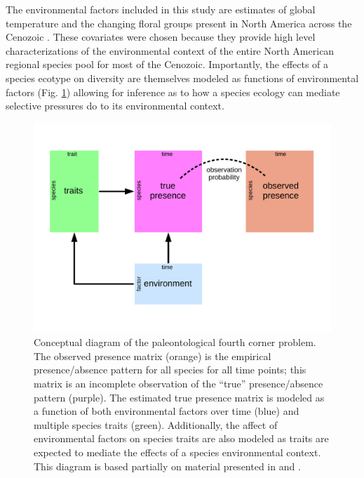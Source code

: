 \documentclass[12pt,letterpaper]{article}
\begin{document}
The environmental factors included in this study are estimates of global temperature and the changing floral groups present in North America across the Cenozoic \citep{Cramer2011,Graham2011a}. These covariates were chosen because they provide high level characterizations of the environmental context of the entire North American regional species pool for most of the Cenozoic. Importantly, the effects of a species ecotype on diversity are themselves modeled as functions of environmental factors (Fig. \ref{fig:concept_fourth_corner}) allowing for inference as to how a species ecology can mediate selective pressures do to its environmental context. 

\begin{figure}[ht]
  \centering
  \includegraphics[width=\textwidth,height=0.4\textheight,keepaspectratio=true]{figure/paleo_fourth_corner}
  \caption[Conceptual diagram of the paleontological fourth-courner problem]{Conceptual diagram of the paleontological fourth corner problem. The observed presence matrix (orange) is the empirical presence/absence pattern for all species for all time points; this matrix is an incomplete observation of the ``true'' presence/absence pattern (purple). The estimated true presence matrix is modeled as a function of both environmental factors over time (blue) and multiple species traits (green). Additionally, the affect of environmental factors on species traits are also modeled as traits are expected to mediate the effects of a species environmental context. This diagram is based partially on material presented in \citet{Brown2014c} and \citet{Warton2015a}.}
  \label{fig:concept_fourth_corner}
\end{figure}
\end{document}
